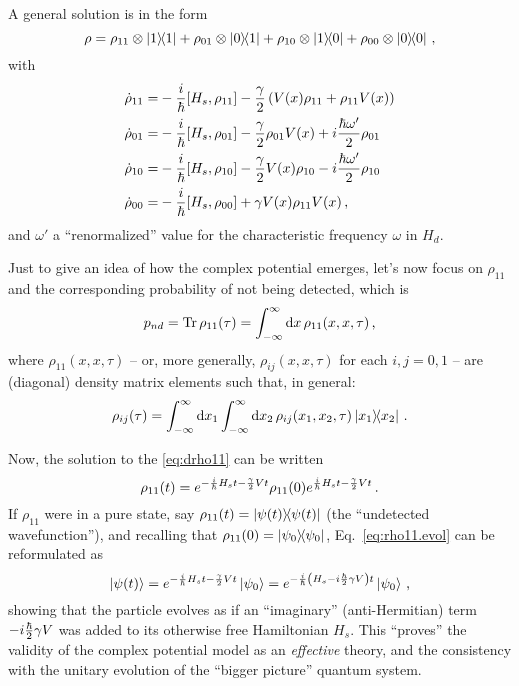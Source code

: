 A general solution is in the form
\begin{equation}
  \rho =
  \rho_{11} \otimes \ketbra{1}{1}
+ \rho_{01} \otimes \ketbra{0}{1}
+ \rho_{10} \otimes \ketbra{1}{0}
+ \rho_{00} \otimes \ketbra{0}{0}
\,\text{,}
\end{equation}
with
\begin{subequations}\begin{align}
  \dot{\rho}_{11} =& -\frac{i}{\hbar} [ H_s, \rho_{11} ] -\frac{\gamma}{2}\left(V(x)\rho_{11} + \rho_{11}V(x)\right) \label{eq:drho11} \\
  \dot{\rho}_{01} =& -\frac{i}{\hbar} [ H_s, \rho_{01} ] -\frac{\gamma}{2}\rho_{01}V(x) + i \frac{\hbar\omega'}{2} \rho_{01}\\
  \dot{\rho}_{10} =& -\frac{i}{\hbar} [ H_s, \rho_{10} ] -\frac{\gamma}{2}V(x)\rho_{10} - i \frac{\hbar\omega'}{2} \rho_{10}\\
  \dot{\rho}_{00} =& -\frac{i}{\hbar} [ H_s, \rho_{00} ] +\gamma V(x)\rho_{11}V(x) \,\text{,}
\end{align}\end{subequations}
and $\omega'$ a ``renormalized'' value for the characteristic frequency $\omega$ in $H_d$.

Just to give an idea of how the complex potential emerges, let's now focus on $\rho_{11}$
and the corresponding probability of not being detected, which is
\begin{equation}\label{eq:p_nd}
  p_{nd} = \Tr \rho_{11}(\tau) = \int_{-\infty}^{\infty} \dd{x} \rho_{11}(x, x, \tau) \,\text{,}
\end{equation}
where $\rho_{11}(x, x, \tau)$
-- or, more generally, $\rho_{ij}(x, x, \tau)$ for each $i, j = 0, 1$ --
are (diagonal) density matrix elements such that, in general:
\begin{equation}
  \rho_{ij}(\tau) = \int_{-\infty}^{\infty} \dd{x_1} \int_{-\infty}^{\infty} \dd{x_2} \rho_{ij}(x_1, x_2, \tau) \ketbra{x_1}{x_2}
  \, \text{.}
\end{equation}

Now, the solution to the \eqref{eq:drho11} can be written
\begin{equation}\label{eq:rho11.evol}
  \rho_{11}(t) =  e^{-\frac{i}{\hbar}H_{s}t-\frac{\gamma}{2}Vt}
  \rho_{11}(0)    e^{ \frac{i}{\hbar}H_{s}t-\frac{\gamma}{2}Vt} \, \text{.}
\end{equation}
If $\rho_{11}$ were in a pure state, say $\rho_{11}(t) = \ketbra{\psi(t)}$
(the ``undetected wavefunction''),
and recalling that $\rho_{11}(0) = \ketbra{\psi_0}$,
Eq.~\eqref{eq:rho11.evol} can be reformulated as
\begin{equation}
  \ket{\psi(t)} =
  e^{-\frac{i}{\hbar}H_{s}t-\frac{\gamma}{2}Vt} \ket{\psi_0} =
  e^{-\frac{i}{\hbar} \qty( H_{s} -i\frac{\hbar}{2}\gamma V ) t} \ket{\psi_0} \,\text{,}
\end{equation}
showing that the particle evolves as if an ``imaginary'' (anti-Hermitian) term
$-i\frac{\hbar}{2}\gamma V$ was added to its otherwise free Hamiltonian $H_s$.
This ``proves'' the validity of the complex potential model as an \emph{effective} theory,
and the consistency
with the unitary evolution of the ``bigger picture'' quantum system.


